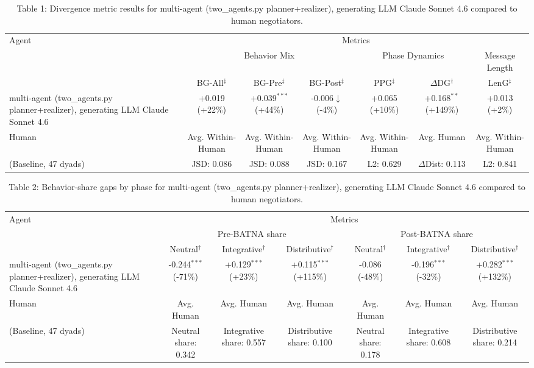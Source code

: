 \begin{table}[t]
\centering
\begin{tabular}{lcccccc}
\toprule
\multirow{3}{*}{Agent} & \multicolumn{6}{c}{Metrics} \\
\cmidrule(lr){2-7}
 & \multicolumn{3}{c}{Behavior Mix} & \multicolumn{2}{c}{Phase Dynamics} & \multicolumn{1}{c}{Message Length} \\
\cmidrule(lr){2-4} \cmidrule(lr){5-6} \cmidrule(lr){7-7}
 & BG-All$^\ddagger$ & BG-Pre$^\ddagger$ & BG-Post$^\ddagger$ & PPG$^\ddagger$ & $\Delta$DG$^\dagger$ & LenG$^\ddagger$ \\
\midrule
multi-agent (two_agents.py planner+realizer), generating LLM Claude Sonnet 4.6 & +0.019 (+22\%) & +0.039$^{***}$ (+44\%) & -0.006$\downarrow$ (-4\%) & +0.065 (+10\%) & +0.168$^{**}$ (+149\%) & +0.013 (+2\%) \\
\midrule
Human & Avg. Within-Human & Avg. Within-Human & Avg. Within-Human & Avg. Within-Human & Avg. Human & Avg. Within-Human \\
(Baseline, 47 dyads) & JSD: 0.086 & JSD: 0.088 & JSD: 0.167 & L2: 0.629 & $\Delta$Dist: 0.113 & L2: 0.841 \\
\bottomrule
\end{tabular}
\caption{Table 1: Divergence metric results for multi-agent (two_agents.py planner+realizer), generating LLM Claude Sonnet 4.6 compared to human negotiators.}
\end{table}

\begin{table}[t]
\centering
\begin{tabular}{lcccccc}
\toprule
\multirow{3}{*}{Agent} & \multicolumn{6}{c}{Metrics} \\
\cmidrule(lr){2-7}
 & \multicolumn{3}{c}{Pre-BATNA share} & \multicolumn{3}{c}{Post-BATNA share} \\
\cmidrule(lr){2-4} \cmidrule(lr){5-7}
 & Neutral$^\dagger$ & Integrative$^\dagger$ & Distributive$^\dagger$ & Neutral$^\dagger$ & Integrative$^\dagger$ & Distributive$^\dagger$ \\
\midrule
multi-agent (two_agents.py planner+realizer), generating LLM Claude Sonnet 4.6 & -0.244$^{***}$ (-71\%) & +0.129$^{***}$ (+23\%) & +0.115$^{***}$ (+115\%) & -0.086 (-48\%) & -0.196$^{***}$ (-32\%) & +0.282$^{***}$ (+132\%) \\
\midrule
Human & Avg. Human & Avg. Human & Avg. Human & Avg. Human & Avg. Human & Avg. Human \\
(Baseline, 47 dyads) & Neutral share: 0.342 & Integrative share: 0.557 & Distributive share: 0.100 & Neutral share: 0.178 & Integrative share: 0.608 & Distributive share: 0.214 \\
\bottomrule
\end{tabular}
\caption{Table 2: Behavior-share gaps by phase for multi-agent (two_agents.py planner+realizer), generating LLM Claude Sonnet 4.6 compared to human negotiators.}
\end{table}
